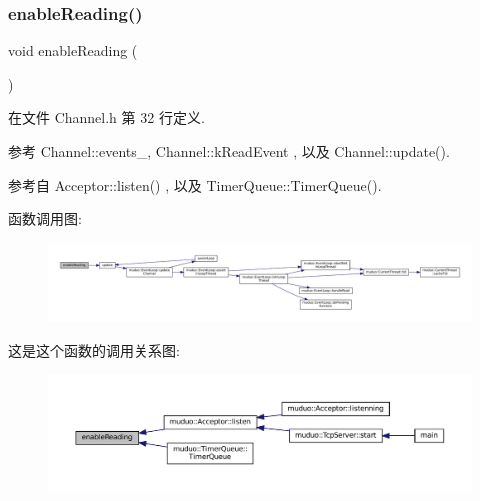 \subsubsection{\texorpdfstring{enable\+Reading()}{enableReading()}}
{\footnotesize\ttfamily void enable\+Reading (\begin{DoxyParamCaption}{ }\end{DoxyParamCaption})\hspace{0.3cm}{\ttfamily [inline]}}



在文件 Channel.\+h 第 32 行定义.



参考 Channel\+::events\+\_\+, Channel\+::k\+Read\+Event , 以及 Channel\+::update().



参考自 Acceptor\+::listen() , 以及 Timer\+Queue\+::\+Timer\+Queue().

函数调用图\+:
\nopagebreak
\begin{figure}[H]
\begin{center}
\leavevmode
\includegraphics[width=350pt]{classmuduo_1_1Channel_ad31f735a6d5ad83203d977ad8eafb223_cgraph}
\end{center}
\end{figure}
这是这个函数的调用关系图\+:
\nopagebreak
\begin{figure}[H]
\begin{center}
\leavevmode
\includegraphics[width=350pt]{classmuduo_1_1Channel_ad31f735a6d5ad83203d977ad8eafb223_icgraph}
\end{center}
\end{figure}
\mbox{\label{classmuduo_1_1Channel_af1dff4317f202ed06097a1425a4dca6d}} 
